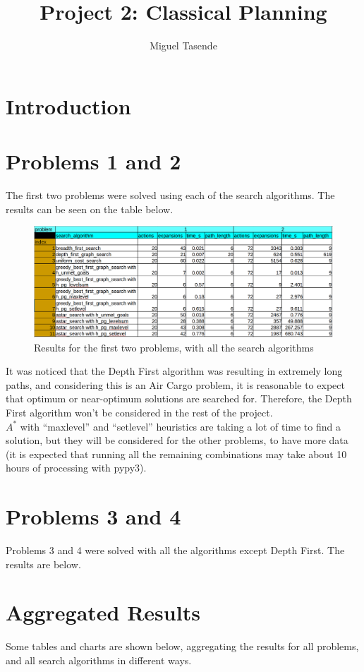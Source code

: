\documentclass[a4paper,12pt]{article}
\title{\textbf{Project 2: Classical Planning}}
\author{Miguel Tasende}
\begin{document}
\maketitle

\section{Introduction}


\section{Problems 1 and 2}
The first two problems were solved using each of the search algorithms. The results can be seen on the table below.

\begin{figure}[!h]
\centering
\includegraphics[width=6.0in]{results/results12.png}
\caption{Results for the first two problems, with all the search algorithms}
\label{fig_raw_data}
\end{figure}

It was noticed that the Depth First algorithm was resulting in extremely long paths, and considering this is an Air Cargo problem, it is reasonable to expect that optimum or near-optimum solutions are searched for. Therefore, the Depth First algorithm won't be considered in the rest of the project.\\
$A^*$ with ``maxlevel'' and ``setlevel'' heuristics are taking a lot of time to find a solution, but they will be considered for the other problems, to have more data (it is expected that running all the remaining combinations may take about 10 hours of processing with pypy3).

\section{Problems 3 and 4}
Problems 3 and 4 were solved with all the algorithms except Depth First. The results are below.


\section{Aggregated Results}
Some tables and charts are shown below, aggregating the results for all problems, and all search algorithms in different ways.
\end{document}
